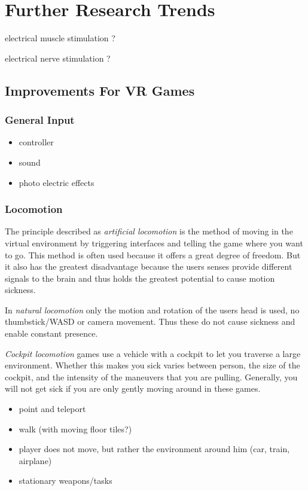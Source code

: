 \section{Further Research Trends}

electrical muscle stimulation ?

electrical nerve stimulation ?

\subsection{Improvements For VR Games}
\subsubsection{General Input}

\begin{itemize}
	\item controller
	\item sound
	\item photo electric effects
\end{itemize}

\subsubsection{Locomotion}

The principle described as \textit{artificial locomotion} is the method of moving in the virtual environment by triggering interfaces and telling the game where you want to go. This method is often used because it offers a great degree of freedom. But it also has the greatest disadvantage because the users senses provide different signals to the brain and thus holds the greatest potential to cause motion sickness.

In \textit{natural locomotion} only the motion and rotation of the users head is used, no thumbstick/WASD or camera movement. Thus these do not cause sickness and enable constant presence.

\textit{Cockpit locomotion} games use a vehicle with a cockpit to let you traverse a large environment. Whether this makes you sick varies between person, the size of the cockpit, and the intensity of the maneuvers that you are pulling. Generally, you will not get sick if you are only gently moving around in these games. 

\begin{itemize}
	\item point and teleport
	\item walk (with moving floor tiles?)
	\item player does not move, but rather the environment around him (car, train, airplane)
	\item stationary weapons/tasks
\end{itemize}


